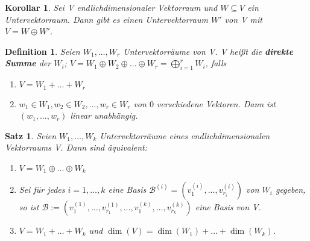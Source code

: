 \documentclass[12pt,a4paper]{article}
\theoremstyle{plain}
\newtheorem{Satz}[Theorem]{Satz}
\newtheorem{Korollar}[Theorem]{Korollar}
\newtheorem{Definition}[Theorem]{Definition}
\newcommand{\herv}[1]{{\emph{\textbf{#1}}}}
\numberwithin{equation}{section}
\begin{document}
\begin{Korollar}
Sei V endlichdimensionaler Vektorraum und $W\subseteq V$ ein Untervektorraum. Dann gibt es einen Untervektorraum $W'$ von V mit $V=W\oplus W'$.
\end{Korollar}
\begin{Definition}
Seien $W_1,\ldots,W_r$ Untervektorräume von V. V heißt die \herv{direkte Summe} der $W_i$; $V=W_1\oplus W_2\oplus \ldots \oplus W_r = \bigoplus _{i=1}^r{W_i}$, falls \begin{enumerate}
\renewcommand{\labelenumi}{\emph{\underline{DS\arabic{enumi}}}}
\item $V=W_1+\ldots+W_r$
\item $w_1\in W_1, w_2\in W_2,\ldots,w_r\in W_r$ von $0$ verschiedene Vektoren. Dann ist $(w_1,\ldots,w_r)$ linear unabhängig.
\end{enumerate}
\end{Definition}
\begin{Satz}
Seien $W_1,\ldots,W_k$ Untervektorräume eines endlichdimensionalen Vektorraums V. Dann sind äquivalent:
\begin{enumerate}
\renewcommand{\labelenumi}{\emph{(\roman{enumi})}}
\item $V=W_1\oplus \ldots \oplus W_k$
\item Sei für jedes $i=1,\ldots,k$ eine Basis $\mathcal{B}^{(i)}=(v_1^{(i)},\ldots,v_{r_i}^{(i)})$ von $W_i$ gegeben, so ist $\mathcal{B}:=(v_1^{(1)},\ldots,v_{r_1}^{(1)},\ldots,v_1^{(k)},\ldots,v_{r_k}^{(k)})$ eine Basis von V.
\item $V=W_1+\ldots+W_k$ und $\dim(V)=\dim(W_1)+\ldots+\dim(W_k)$.
\end{enumerate}
\end{Satz}
\end{document}
